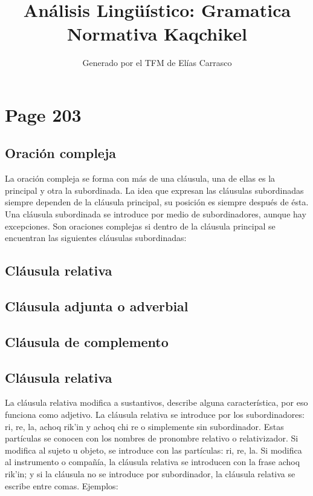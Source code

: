 \documentclass{article}%
\title{Análisis Lingüístico: Gramatica Normativa Kaqchikel}%
\author{Generado por el TFM de Elías Carrasco}%
\begin{document}
%
\normalsize%
\maketitle%
\section{Page 203}%
\label{sec:Page203}%
\subsection{Oración compleja}%
\label{subsec:Oracincompleja}%

%
La oración compleja se forma con más de una cláusula, una de ellas es la principal y %
otra la subordinada. La idea que expresan las cláusulas subordinadas siempre dependen %
de la cláusula principal, su posición es siempre después de ésta. Una cláusula subordinada %
se introduce por medio de subordinadores, aunque hay excepciones. Son oraciones %
complejas si dentro de la cláusula principal se encuentran las siguientes cláusulas %
subordinadas: %
\subsection{Cláusula relativa}%
\label{subsec:Clusularelativa}%

%
\subsection{Cláusula adjunta o adverbial}%
\label{subsec:Clusulaadjuntaoadverbial}%

%
\subsection{Cláusula de complemento}%
\label{subsec:Clusuladecomplemento}%

%
\subsection{Cláusula relativa}%
\label{subsec:Clusularelativa}%

%
La cláusula relativa modifica a sustantivos, describe alguna característica, por eso %
funciona como adjetivo. La cláusula relativa se introduce por los subordinadores: ri, %
re, la, achoq rik'in y achoq chi re o simplemente sin subordinador. Estas partículas se %
conocen con los nombres de pronombre relativo o relativizador. Si modifica al sujeto u %
objeto, se introduce con las partículas: ri, re, la. Si modifica al instrumento o compañía, %
la cláusula relativa se introducen con la frase achoq rik'in; y si la cláusula no se %
introduce por subordinador, la cláusula relativa se escribe entre comas. Ejemplos: %
\end{document}
